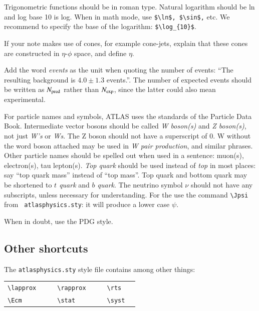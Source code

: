 \documentclass[11pt,a4paper]{atlasnote}
\begin{document}
Trigonometric functions should be in roman type. Natural logarithm
should be ln and log base 10 is log.  When in math mode, use
\verb+$\ln$, $\sin$,+ etc. We recommend to specify the base of the
logarithm: \verb+$\log_{10}$+.

If your note makes use of cones, for example cone-jets, explain that
these cones are constructed in $\eta$-$\phi$ space, and define $\eta$.

Add the word \emph{events} as the unit when quoting the number of
events: ``The resulting background is $4.0 \pm 1.3$ events.''.  The
number of expected events should be written as $N_{\rm pred}$ rather
than $N_{\rm exp}$, since the latter could also mean experimental.

For particle names and symbols, ATLAS uses the standards of the
Particle Data Book. Intermediate vector bosons should be called
\emph{W boson(s)} and \emph{Z boson(s)}, not just \emph{W's} or
\emph{Ws}. The Z boson should not have a superscript of 0. W without
the word boson attached may be used in \emph{W pair production}, and
similar phrases.  Other particle names should be spelled out when used
in a sentence: muon(s), electron(s), tau lepton(s). \emph{Top quark}
should be used instead of \emph{top} in most places: say ``top quark
mass'' instead of ``top mass''.  Top quark and bottom quark may be
shortened to \emph{$t$ quark} and \emph{$b$ quark}. The neutrino
symbol $\nu$ should not have any subscripts, unless necessary for
understanding. For the \Jpsi{} use the command \verb+\Jpsi+ from {\tt
atlasphysics.sty}: it will produce a lower case $\psi$.

When in doubt, use the PDG style.

\subsection{Other shortcuts}

\noindent The {\tt atlasphysics.sty} style file contains among
other things:

\medskip

\begin{tabular}{llcllcll}
  \verb+\lapprox+ & \lapprox{} & \hspace{1cm} &
  \verb+\rapprox+ & \rapprox{}  &\hspace{1cm} &
  \verb+\rts+  & \rts{} \\
  \verb+\Ecm+ & \Ecm{} & &
  \verb+\stat+ & \stat{} & &
  \verb+\syst+ & \syst{} \\
\end{tabular}
\end{document}
